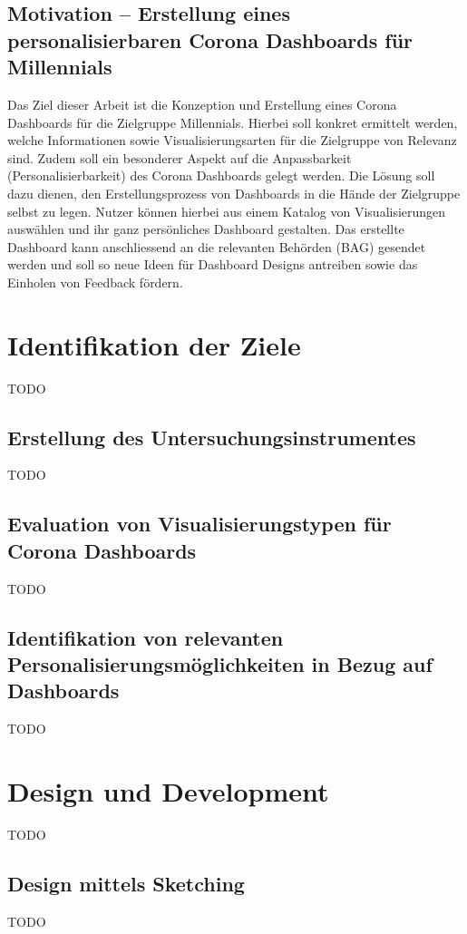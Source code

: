 \documentclass[12pt, oneside]{article}
\begin{document}
\subsection{Motivation – Erstellung eines personalisierbaren Corona Dashboards für Millennials}
Das Ziel dieser Arbeit ist die Konzeption und Erstellung eines Corona Dashboards für die Zielgruppe Millennials. Hierbei soll konkret ermittelt werden, welche Informationen sowie Visualisierungsarten für die Zielgruppe von Relevanz sind. Zudem soll ein besonderer Aspekt auf die Anpassbarkeit (Personalisierbarkeit) des Corona Dashboards gelegt werden. Die Lösung soll dazu dienen, den Erstellungsprozess von Dashboards in die Hände der Zielgruppe selbst zu legen. Nutzer können hierbei aus einem Katalog von Visualisierungen auswählen und ihr ganz persönliches Dashboard gestalten. Das erstellte Dashboard kann anschliessend an die relevanten Behörden (BAG) gesendet werden und soll so neue Ideen für Dashboard Designs antreiben sowie das Einholen von Feedback fördern.

\clearpage
\section{Identifikation der Ziele}
TODO

\subsection{Erstellung des Untersuchungsinstrumentes}
TODO

\subsection{Evaluation von Visualisierungstypen für Corona Dashboards}
TODO

\subsection{Identifikation von relevanten Personalisierungsmöglichkeiten in Bezug auf Dashboards}
TODO

\clearpage
\section{Design und Development}
TODO

\subsection{Design mittels Sketching}
TODO
\end{document}
